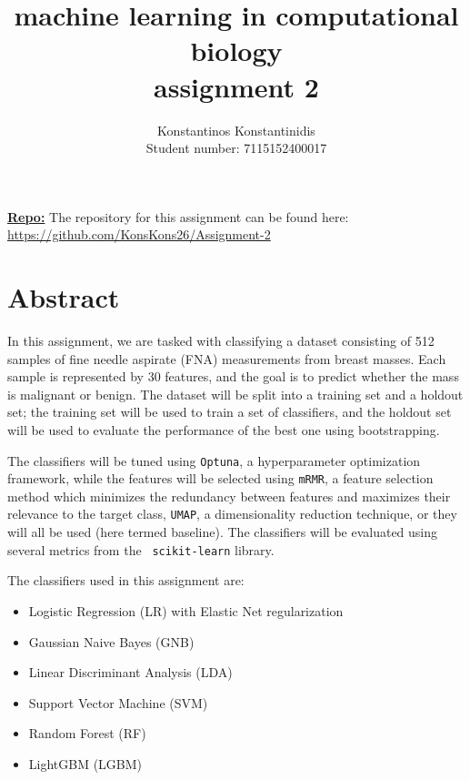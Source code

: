 \documentclass[12pt]{article}
\title{%
    machine learning in computational biology \\
    \Large assignment 2
    }
\author{%
    Konstantinos Konstantinidis \\
    Student number: 7115152400017
    }
\begin{document}
\maketitle

\vspace{0.5in}

\textbf{\underline{Repo:}} The repository for this assignment can be found %
here: \\
\url{https://github.com/KonsKons26/Assignment-2}

\vspace{0.5in}

\tableofcontents
\clearpage



\section{Abstract}

In this assignment, we are tasked with classifying a dataset consisting of 512
samples of fine needle aspirate (FNA) measurements from breast masses. Each
sample is represented by 30 features, and the goal is to predict whether the
mass is malignant or benign. The dataset will be split into a training set and a
holdout set; the training set will be used to train a set of classifiers, and
the holdout set will be used to evaluate the performance of the best one using
bootstrapping.

The classifiers will be tuned using \texttt{Optuna}, a hyperparameter
optimization framework, while the features will be selected using \texttt{mRMR},
a feature selection method which minimizes the redundancy between features and
maximizes their relevance to the target class, \texttt{UMAP}, a dimensionality
reduction technique, or they will all be used (here termed baseline). The
classifiers will be evaluated using several metrics from the \texttt{%
scikit-learn} library.

The classifiers used in this assignment are:

\begin{itemize}
    \item Logistic Regression (LR) with Elastic Net regularization
    \item Gaussian Naive Bayes (GNB)
    \item Linear Discriminant Analysis (LDA)
    \item Support Vector Machine (SVM)
    \item Random Forest (RF)
    \item LightGBM (LGBM)
\end{itemize}
\end{document}
